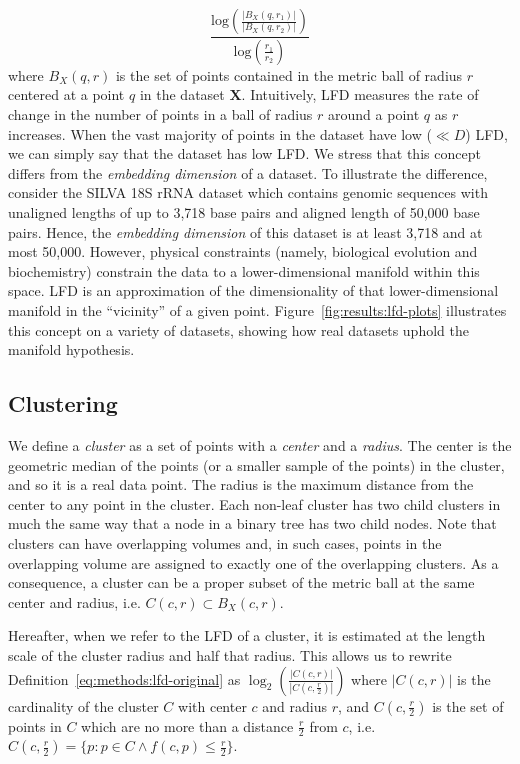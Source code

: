 \begin{equation}
    \frac{\text{log} \left( \frac{|B_X(q, r_1)|}{|B_X(q, r_2)|} \right) }{\text{log} \left( \frac{r_1}{r_2} \right) }
    \label{eq:methods:lfd-original}
\end{equation}
where $B_X(q, r)$ is the set of points contained in the metric ball of radius $r$ centered at a point $q$ in the dataset $\textbf{X}$.
Intuitively, LFD measures the rate of change in the number of points in a ball of radius $r$ around a point $q$ as $r$ increases. When the vast majority of points in the dataset have low ($\ll D$) LFD, we can simply say that the dataset has low LFD.
We stress that this concept differs from the \textit{embedding dimension} of a dataset.
To illustrate the difference, consider the SILVA 18S rRNA dataset which contains genomic sequences with unaligned lengths of up to 3,718 base pairs and aligned length of 50,000 base pairs.
Hence, the \textit{embedding dimension} of this dataset is at least 3,718 and at most 50,000.
However, physical constraints (namely, biological evolution and biochemistry) constrain the data to a lower-dimensional manifold within this space.
LFD is an approximation of the dimensionality of that lower-dimensional manifold in the ``vicinity'' of a given point.
Figure~\ref{fig:results:lfd-plots} illustrates this concept on a variety of datasets, showing how real datasets uphold the manifold hypothesis.


\subsection{Clustering}
\label{sec:methods:clustering}

We define a \textit{cluster} as a set of points with a \textit{center} and a \textit{radius}.
The center is the geometric median of the points (or a smaller sample of the points) in the cluster, and so it is a real data point.
The radius is the maximum distance from the center to any point in the cluster.
Each non-leaf cluster has two child clusters in much the same way that a node in a binary tree has two child nodes.
Note that clusters can have overlapping volumes and, in such cases, points in the overlapping volume are assigned to exactly one of the overlapping clusters.
As a consequence, a cluster can be a proper subset of the metric ball at the same center and radius, i.e. $C(c, r) \subset B_X(c, r)$.

Hereafter, when we refer to the LFD of a cluster, it is estimated at the length scale of the cluster radius and half that radius.
This allows us to rewrite Definition~\ref{eq:methods:lfd-original} as
$
    \log_2 \left( \frac{|C(c, r)|}{|C(c, \frac{r}{2})|} \right)
    \label{eq:methods:lfd-simplified}
$
where $|C(c, r)|$ is the cardinality of the cluster $C$ with center $c$ and radius $r$, and $C(c, \frac{r}{2})$ is the set of points in $C$ which are no more than a distance $\frac{r}{2}$ from $c$, i.e. $C(c, \frac{r}{2}) = \{p : p \in C \land f(c, p) \leq \frac{r}{2}\}$.

